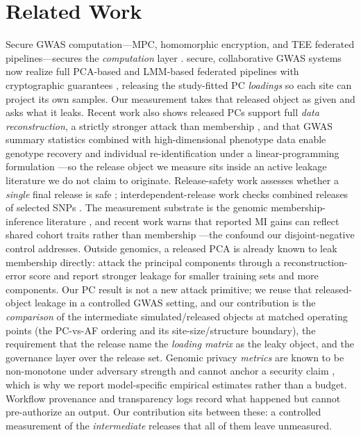 \documentclass[11pt]{article}
\begin{document}
\section{Related Work}
Secure GWAS computation---MPC, homomorphic encryption, and TEE federated
pipelines---secures the \emph{computation} layer \citep{ostrak2021, aherrahrou2024,
ppgwas2025, fedlmm2025}. secure, collaborative GWAS systems now realize full PCA-based and
LMM-based federated pipelines with cryptographic guarantees
\citep{sfgwas2025}, releasing the study-fitted PC \emph{loadings} so each site
can project its own samples. Our measurement takes that released object as
given and asks what it leaks. Recent work also shows released PCs support full
\emph{data reconstruction}, a strictly stronger attack than membership
\citep{kwatra2023}, and that GWAS summary statistics combined with
high-dimensional phenotype data enable genotype recovery and individual
re-identification under a linear-programming formulation \citep{lan2025}---so
the release object we measure sits inside an active leakage literature we do
not claim to originate. Release-safety work assesses whether a \emph{single}
final release is safe \citep{pascoal2022, igwas2023}; interdependent-release work
checks combined releases of selected SNPs \citep{igwas2023}. The measurement
substrate is the genomic membership-inference literature
\citep{homer2008, sankararaman2009, shringarpure2015, bu2021}, and recent work
warns that reported MI gains can reflect shared cohort traits rather than
membership \citep{popets2026}---the confound our disjoint-negative control
addresses. Outside genomics, a released PCA is already known to leak membership
directly: \citet{zari2022} attack the principal components through a
reconstruction-error score and report stronger leakage for smaller training sets
and more components. Our PC result is not a new attack primitive; we reuse that
released-object leakage in a controlled GWAS setting, and our contribution is the
\emph{comparison} of the intermediate simulated/released objects at matched
operating points (the PC-vs-AF ordering and its site-size/structure boundary),
the requirement that the release name the \emph{loading matrix} as the leaky
object, and the governance layer over the release set. Genomic privacy
\emph{metrics} are known to be non-monotone under
adversary strength and cannot anchor a security claim \citep{wagner2016}, which
is why we report model-specific empirical estimates rather than a budget.
Workflow provenance and transparency logs \citep{prov-o, intoto, rfc6962} record
what happened but cannot pre-authorize an output. Our contribution sits between
these: a controlled measurement of the \emph{intermediate} releases that all of
them leave unmeasured.
\end{document}
